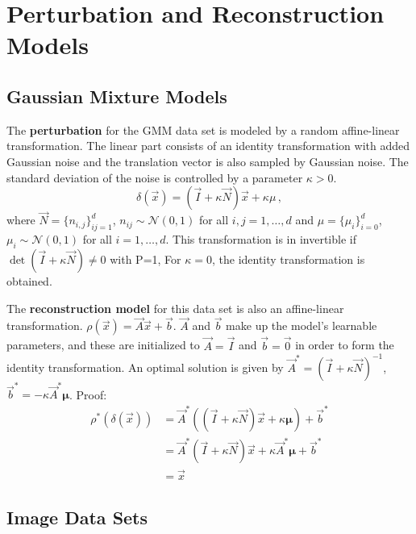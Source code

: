 \section{Perturbation and Reconstruction Models}
\label{sec:reconstruction_models}


\subsection{Gaussian Mixture Models}

The \textbf{perturbation} for the GMM data set is modeled by
a random affine-linear transformation.
The linear part consists of an identity transformation with added Gaussian noise
and the translation vector is also sampled by Gaussian noise.
The standard deviation of the noise is controlled by a parameter $\kappa > 0$.
\[
    \delta(\vec x) = (\vec I + \kappa \vec N)\vec x + \kappa \mu \,,
\]
where $\vec N = \{n_{i, j}\}_{i j = 1}^{d}$, $n_{ij} \sim \mathcal N (0, 1)$ for all $i, j = 1 , \ldots, d$
and 
$\mu = \{\mu_i\}_{i=0}^d$, $\mu_i \sim \mathcal N(0, 1)$ for all $i=1,\ldots,d$.
This transformation is in invertible if $\det (\vec I + \kappa \vec N) \neq 0$ with P=1,
For $\kappa = 0$, the identity transformation is obtained.

The \textbf{reconstruction model} for this data set is also an affine-linear transformation. 
$\rho(\vec x) = \vec A \vec x + \vec b$.
$\vec A$ and $\vec b$ make up the model's learnable parameters, and
these are initialized to $\vec A = \vec I$ and $\vec b = \vec 0$ in order to form the identity transformation.
An optimal solution is given by
$\vec A^* = (\vec I + \kappa \vec N)^{-1}$, $\vec b^* = -\kappa \vec A^* \boldsymbol \mu$.
Proof:
\begin{equation}
\label{eqn:gmm_optimal}
\begin{split}
    \rho^* ( \delta (\vec x)) 
    &= \vec A^* ((\vec I + \kappa \vec N)\vec x + \kappa \boldsymbol \mu) + \vec b^* \\
    &= \vec A^* (\vec I + \kappa \vec N)\vec x + \kappa \vec A^* \boldsymbol \mu + \vec b^* \\
    &= \vec x
\end{split}
\end{equation}

\subsection{Image Data Sets}

